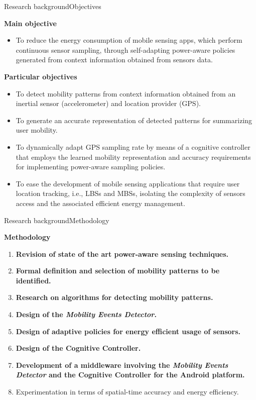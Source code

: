\begin{frame}{Research background}{Objectives}
\small
\begin{block}{\small \textbf{Main objective}}
\begin{itemize}
  \item To reduce the energy consumption of mobile sensing apps, which perform continuous sensor sampling, through self-adapting power-aware policies generated from context information obtained from sensors data.
\end{itemize}
\end{block}

\begin{block}{\small \textbf{Particular objectives}}
\begin{itemize}
  \item To detect mobility patterns from context information obtained from an inertial sensor (accelerometer) and location provider (GPS).
  \item To generate an accurate representation of detected patterns for summarizing user mobility.
  \item To dynamically adapt GPS sampling rate by means of a cognitive controller that employs the learned mobility representation and accuracy requirements for implementing power-aware sampling policies.
  \item To ease the development of mobile sensing applications that require user location tracking, i.e., LBSs and MBSs, isolating the complexity of sensors access and the associated efficient energy management.
\end{itemize}
\end{block}
\end{frame}


\begin{frame}{Research background}{Methodology}
\small
\begin{block}{\small \textbf{Methodology}}
\begin{enumerate}
  \item \textbf{Revision of state of the art power-aware sensing techniques.}
  \item \textbf{Formal definition and selection of mobility patterns to be identified.}
  \item \textbf{Research on algorithms for detecting mobility patterns.}
  \item \textbf{Design of the \emph{Mobility Events Detector}.}
  \item \textbf{Design of adaptive policies for energy efficient usage of sensors.}
  \item \textbf{Design of the Cognitive Controller.}
  \item \textbf{Development of a middleware involving the \emph{Mobility Events Detector} and the Cognitive Controller for the Android platform.}
  \item Experimentation in terms of spatial-time accuracy and energy efficiency.
\end{enumerate}
\end{block}
\end{frame}
